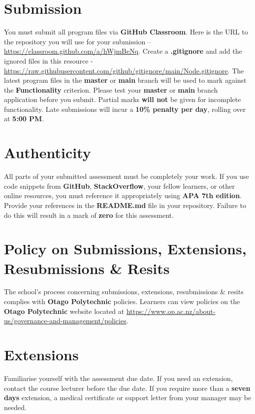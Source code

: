 \documentclass{article}
\begin{document}
\section*{Submission}
You must submit all program files via \textbf{GitHub Classroom}. Here is the URL to the repository you will use for your submission – \href{https://classroom.github.com/a/hWjmBeNq}{https://classroom.github.com/a/hWjmBeNq}.  Create a \textbf{.gitignore} and add the ignored files in this resource - \href{https://raw.githubusercontent.com/github/gitignore/main/Node.gitignore}{https://raw.githubusercontent.com/github/gitignore/main/Node.gitignore}. The latest program files in the \textbf{master} or \textbf{main} branch will be used to mark against the \textbf{Functionality} criterion. Please test your \textbf{master} or \textbf{main} branch application before you submit. Partial marks \textbf{will not} be given for incomplete functionality. Late submissions will incur a \textbf{10\% penalty per day}, rolling over at \textbf{5:00 PM}.

\section*{Authenticity}
All parts of your submitted assessment must be completely your work. If you use code snippets from \textbf{GitHub}, \textbf{StackOverflow}, your fellow learners, or other online resources, you must reference it appropriately using \textbf{APA 7th edition}. Provide your references in the \textbf{README.md} file in your repository. Failure to do this will result in a mark of \textbf{zero} for this assessment.

\section*{Policy on Submissions, Extensions, Resubmissions \& Resits}
The school's process concerning submissions, extensions, resubmissions \& resits complies with \textbf{Otago Polytechnic} policies. Learners can view policies on the \textbf{Otago Polytechnic} website located at \href{https://www.op.ac.nz/about-us/governance-and-management/policies}{https://www.op.ac.nz/about-us/governance-and-management/policies}.

\section*{Extensions}
Familiarise yourself with the assessment due date. If you need an extension, contact the course lecturer before the due date. If you require more than a \textbf{seven days} extension, a medical certificate or support letter from your manager may be needed.
\end{document}
